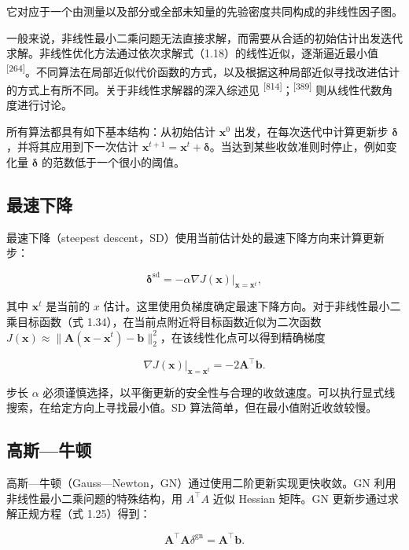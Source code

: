 它对应于一个由测量以及部分或全部未知量的先验密度共同构成的非线性因子图。

一般来说，非线性最小二乘问题无法直接求解，而需要从合适的初始估计出发迭代求解。非线性优化方法通过依次求解式（1.18）的线性近似，逐渐逼近最小值 \textsuperscript{[264]}。不同算法在局部近似代价函数的方式，以及根据这种局部近似寻找改进估计的方式上有所不同。关于非线性求解器的深入综述见 \textsuperscript{[814]}；\textsuperscript{[389]} 则从线性代数角度进行讨论。

所有算法都具有如下基本结构：从初始估计 $\pmb x^0$ 出发，在每次迭代中计算更新步 $\pmb\delta$，并将其应用到下一次估计 $\pmb x^{t+1}=\pmb x^t+\pmb\delta$。当达到某些收敛准则时停止，例如变化量 $\pmb\delta$ 的范数低于一个很小的阈值。

\subsection{最速下降}

最速下降（steepest descent，SD）使用当前估计处的最速下降方向来计算更新步：

\begin{equation}
\pmb {\delta} ^ {\mathrm{sd}} = - \alpha \left. \nabla J (\pmb {x}) \right| _ {\pmb {x} = \pmb {x} ^ {t}},\tag{1.35}
\end{equation}

其中 $\pmb x^t$ 是当前的 $x$ 估计。这里使用负梯度确定最速下降方向。对于非线性最小二乘目标函数（式 1.34），在当前点附近将目标函数近似为二次函数 $J(\pmb x)\approx\|\pmb A(\pmb x-\pmb x^t)-\pmb b\|_2^2$，在该线性化点可以得到精确梯度

\begin{equation*}
\left.\nabla J(\pmb x)\right|_{\pmb x=\pmb x^t}=-2\pmb A^\top\pmb b.
\end{equation*}

步长 $\alpha$ 必须谨慎选择，以平衡更新的安全性与合理的收敛速度。可以执行显式线搜索，在给定方向上寻找最小值。SD 算法简单，但在最小值附近收敛较慢。

\subsection{高斯—牛顿}

高斯—牛顿（Gauss—Newton，GN）通过使用二阶更新实现更快收敛。GN 利用非线性最小二乘问题的特殊结构，用 $A^\top A$ 近似 Hessian 矩阵。GN 更新步通过求解正规方程（式 1.25）得到：

\begin{equation}
\boldsymbol {A} ^ {\top} \boldsymbol {A} \delta^ {\mathrm{gn}} = \boldsymbol {A} ^ {\top} \boldsymbol {b}.\tag{1.36}
\end{equation}

